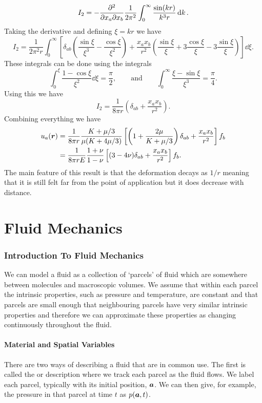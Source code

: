 \documentclass[a4paper]{article}
\begin{document}
    \[I_2 = -\frac{\partial^2{}}{\partial{x_a}\partial{x_b}} \frac{1}{2\pi^2}\int_0^{\infty}\frac{\sin(kr)}{k^3r}\dd{k}.\]
    Taking the derivative and defining \(\xi = kr\) we have
    \[I_2 = \frac{1}{2\pi^2 r} \int_0^{\infty} \left[ \delta_{ab} \left( \frac{\sin\xi}{\xi^3} - \frac{\cos\xi}{\xi^2} \right) + \frac{x_ax_b}{r^2} \left( \frac{\sin \xi}{\xi} + 3\frac{\cos\xi}{\xi} - 3\frac{\sin\xi}{\xi} \right) \right] \dd{\xi}.\]
    These integrals can be done using the integrals
    \[\int_0^{\xi} \frac{1 - \cos\xi}{\xi^2} \dd{\xi} = \frac{\pi}{2}, \qquad\text{and}\qquad \int_0^{\infty} \frac{\xi - \sin\xi}{\xi^3} = \frac{\pi}{4}.\]
    Using this we have
    \[I_2 = \frac{1}{8\pi r}\left( \delta_{ab} + \frac{x_ax_b}{r^2} \right).\]
    Combining everything we have
    \begin{align*}
        u_a(\bm{r}) &= \frac{1}{8\pi r} \frac{K + \mu/3}{\mu(K + 4\mu/3)} \left[ \left( 1 + \frac{2\mu}{K + \mu/3} \right)\delta_{ab} + \frac{x_ax_b}{r^2} \right]f_b\\
        &= \frac{1}{8\pi r E}\frac{1 + \nu}{1 - \nu} \left[ (3 - 4\nu)\delta_{ab} + \frac{x_ax_b}{r^2} \right]f_b.
    \end{align*}
    The main feature of this result is that the deformation decays as \(1/r\) meaning that it is still felt far from the point of application but it does decrease with distance.
    
    \part{Fluid Mechanics}
    \section{Introduction To Fluid Mechanics}
    We can model a fluid as a collection of `parcels' of fluid which are somewhere between molecules and macroscopic volumes.
    We assume that within each parcel the intrinsic properties, such as pressure and temperature, are constant and that parcels are small enough that neighbouring parcels have very similar intrinsic properties and therefore we can approximate these properties as changing continuously throughout the fluid.
    
    \subsection{Material and Spatial Variables}
    There are two ways of describing a fluid that are in common use.
    The first is called the  or  description where we track each parcel as the fluid flows.
    We label each parcel, typically with its initial position, \(\bm{a}\).
    We can then give, for example, the pressure in that parcel at time \(t\) as \(p(\bm{a}, t)\).
    
\end{document}
